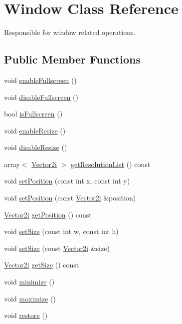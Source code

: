 \hypertarget{class_window}{\section{Window Class Reference}
\label{class_window}
}


Responsible for window related operations.  


\subsection*{Public Member Functions}
\begin{DoxyCompactItemize}
\item 
void \hyperlink{class_window_a11d04c69f1ed262f55818dcd3148d96e}{enable\+Fullscreen} ()
\item 
void \hyperlink{class_window_ae63476a624f22a8e6570257503c942dd}{disable\+Fullscreen} ()
\item 
bool \hyperlink{class_window_a09601411d5da2b4fc85ac1a38820355f}{is\+Fullscreen} ()
\item 
void \hyperlink{class_window_a9cbb8b625751c29026613d9dd8356951}{enable\+Resize} ()
\item 
void \hyperlink{class_window_a8ce4538550692b4b3be9e1ea032af747}{disable\+Resize} ()
\item 
array$<$ \hyperlink{class_vector2i}{Vector2i} $>$ \hyperlink{class_window_abbe7ba6b0d1eae7ed13c2a168bba216e}{get\+Resolution\+List} () const 
\item 
void \hyperlink{class_window_a6ee7f17bbb8ec7aa32c308092477ff66}{set\+Position} (const int x, const int y)
\item 
void \hyperlink{class_window_a85fec7579c4b86beaa672e4a257341eb}{set\+Position} (const \hyperlink{class_vector2i}{Vector2i} \&position)
\item 
\hyperlink{class_vector2i}{Vector2i} \hyperlink{class_window_af446711ecf618cf2c396e24382827504}{get\+Position} () const 
\item 
void \hyperlink{class_window_a645f0139f745c3134c75a2314eae00bd}{set\+Size} (const int w, const int h)
\item 
void \hyperlink{class_window_a751085219540e80aaaba49e56cc2060d}{set\+Size} (const \hyperlink{class_vector2i}{Vector2i} \&size)
\item 
\hyperlink{class_vector2i}{Vector2i} \hyperlink{class_window_add88acca2cb99db823def25c03d84ba3}{get\+Size} () const 
\item 
void \hyperlink{class_window_a85ffaebe489c0ecf8051715ecf59babb}{minimize} ()
\item 
void \hyperlink{class_window_a1aa481996525792213f28d91fbb4894b}{maximize} ()
\item 
void \hyperlink{class_window_afd3595051be2709847c2de4352f27cf5}{restore} ()
\end{DoxyCompactItemize}


